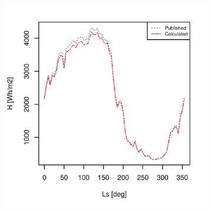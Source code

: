 \begin{figure}[h]
\captionsetup[subfigure]{justification=centering}
\centering
    \setlength{\subfigureWidth}{0.50\textwidth}
    \setlength{\graphicsHeight}{60mm}
    \hypersetup{hidelinks=true}%
    \begin{subfigure}[t]{\subfigureWidth}
        \centering
            \includegraphics[height=\graphicsHeight]{sections/appendix/insolation-calculation-verification/plots/h-exp-calc-at-vl2-with-beta-22-deg.png}
            \label{fig:sub:comparative-global-insolation-at-vl2-beta-optimal-daily-variations}
    \end{subfigure}\hfill
    \begin{subfigure}[t]{\subfigureWidth}
        \centering

\end{subfigure}
\end{figure}
